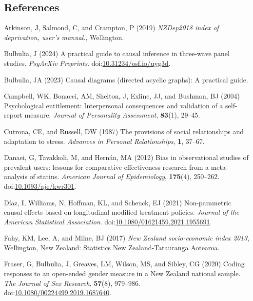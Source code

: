 \documentclass[
  singlecolumn]{article}
\newlength{\cslhangindent}
\newenvironment{CSLReferences}[2] %
 {\begin{list}{}{%
  \setlength{\itemindent}{0pt}
  \setlength{\leftmargin}{0pt}
  \setlength{\parsep}{0pt}
  \ifodd #1
   \setlength{\leftmargin}{\cslhangindent}
   \setlength{\itemindent}{-1\cslhangindent}
  \fi
  \setlength{\itemsep}{#2\baselineskip}}}
 {\end{list}}
\begin{document}
\newpage{}

\subsection{References}\label{references}

\label{refs}
\begin{CSLReferences}{1}{0}
Atkinson, J, Salmond, C, and Crampton, P (2019) \emph{NZDep2018 index of
deprivation, user{'}s manual.}, Wellington.

Bulbulia, J (2024) A practical guide to causal inference in three-wave
panel studies. \emph{PsyArXiv Preprints}.
doi:\href{https://doi.org/10.31234/osf.io/uyg3d}{10.31234/osf.io/uyg3d}.

Bulbulia, JA (2023) Causal diagrams (directed acyclic graphs): A
practical guide.

Campbell, WK, Bonacci, AM, Shelton, J, Exline, JJ, and Bushman, BJ
(2004) Psychological entitlement: Interpersonal consequences and
validation of a self-report measure. \emph{Journal of Personality
Assessment}, \textbf{83}(1), 29--45.

Cutrona, CE, and Russell, DW (1987) The provisions of social
relationships and adaptation to stress. \emph{Advances in Personal
Relationships}, \textbf{1}, 37--67.

Danaei, G, Tavakkoli, M, and Hernán, MA (2012) Bias in observational
studies of prevalent users: lessons for comparative effectiveness
research from a meta-analysis of statins. \emph{American Journal of
Epidemiology}, \textbf{175}(4), 250--262.
doi:\href{https://doi.org/10.1093/aje/kwr301}{10.1093/aje/kwr301}.

Díaz, I, Williams, N, Hoffman, KL, and Schenck, EJ (2021) Non-parametric
causal effects based on longitudinal modified treatment policies.
\emph{Journal of the American Statistical Association}.
doi:\href{https://doi.org/10.1080/01621459.2021.1955691}{10.1080/01621459.2021.1955691}.

Fahy, KM, Lee, A, and Milne, BJ (2017) \emph{New Zealand socio-economic
index 2013}, Wellington, New Zealand: Statistics New Zealand-Tatauranga
Aotearoa.

Fraser, G, Bulbulia, J, Greaves, LM, Wilson, MS, and Sibley, CG (2020)
Coding responses to an open-ended gender measure in a {N}ew {Z}ealand
national sample. \emph{The Journal of Sex Research}, \textbf{57}(8),
979--986.
doi:\href{https://doi.org/10.1080/00224499.2019.1687640}{10.1080/00224499.2019.1687640}.


\end{CSLReferences}
\end{document}
